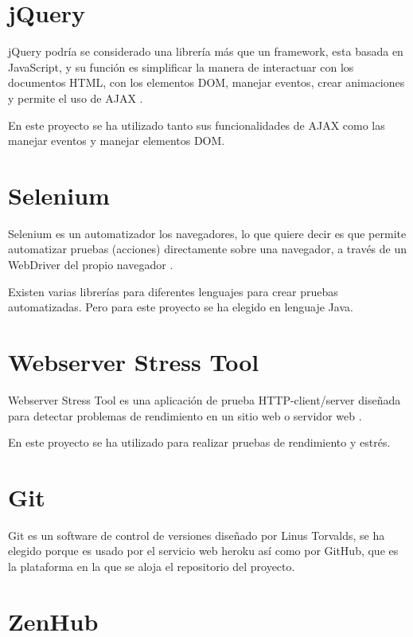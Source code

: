 \section{jQuery}\label{jquery}

jQuery podría se considerado una librería más que un framework, esta basada en JavaScript, y su función es simplificar la manera de interactuar con los documentos HTML, con los elementos DOM, manejar eventos, crear animaciones y permite el uso de AJAX \cite{jquerybib}.

En este proyecto se ha utilizado tanto sus funcionalidades de AJAX como las manejar eventos y manejar elementos DOM.

\section{Selenium}\label{selenium}

Selenium es un automatizador los navegadores, lo que quiere decir es que permite automatizar pruebas (acciones) directamente sobre una navegador, a través de un WebDriver del propio navegador \cite{seleniumbib}.

Existen varias librerías para diferentes lenguajes para crear pruebas automatizadas. Pero para este proyecto se ha elegido en lenguaje Java.

\section{Webserver Stress Tool}\label{WebserverStressTool} 

Webserver Stress Tool es una aplicación de prueba HTTP-client/server diseñada para detectar problemas de rendimiento en un sitio web o servidor web \cite{webserverbib}.

En este proyecto se ha utilizado para realizar pruebas de rendimiento y estrés.

\section{Git}\label{Git}

Git es un software de control de versiones diseñado por Linus Torvalds, se ha elegido porque es usado por el servicio web heroku así como por GitHub, que es la plataforma en la que se aloja el repositorio del proyecto.

\section{ZenHub}\label{zenhub}

